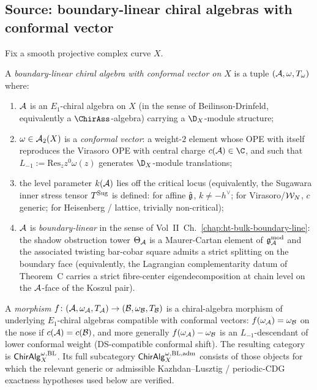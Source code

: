 \subsection{Source: boundary-linear chiral algebras with conformal vector}

Fix a smooth projective complex curve $X$.

\begin{definition}
\label{def:uhf-chiralg-omega-bl}
A \emph{boundary-linear chiral algebra with conformal vector on
$X$} is a tuple $(\mathcal{A}, \omega, T_\omega)$ where:
\begin{enumerate}[label=\textup{(\roman*)}]
\item $\mathcal{A}$ is an $E_1$-chiral algebra on $X$ (in the sense of
 Beilinson-Drinfeld, equivalently a $\ChirAss$-algebra) carrying a
 $\D_X$-module structure;
\item $\omega \in \mathcal{A}_2(X)$ is a \emph{conformal vector}: a
 weight-$2$ element whose OPE with itself reproduces the Virasoro
 OPE with central charge $c(\cA) \in \C$, and such that
 $L_{-1} := \mathrm{Res}_z z^0 \omega(z)$ generates $\D_X$-module
 translations;
\item the level parameter $k(\mathcal{A})$ lies off the critical locus
 (equivalently, the Sugawara inner stress tensor $T^{\mathrm{Sug}}$ is
 defined: for affine $\hat{\mathfrak{g}}$, $k \neq -h^\vee$; for
 Virasoro/$\mathcal{W}_N$, $c$ generic; for Heisenberg / lattice, trivially
 non-critical);
\item $\mathcal{A}$ is \emph{boundary-linear} in the sense of
 Vol~II~Ch.~\ref*{chap:ht-bulk-boundary-line}: the shadow obstruction
 tower $\Theta_{\mathcal{A}}$ is a Maurer-Cartan element of
 $\mathfrak{g}^{\mathrm{mod}}_{\mathcal{A}}$ \textup{and} the associated
 twisting bar-cobar square admits a strict splitting on the
 boundary face (equivalently, the Lagrangian complementarity
 datum of Theorem~C carries a strict fibre-center eigendecomposition
 at chain level on the $\mathcal{A}$-face of the Koszul pair).
\end{enumerate}
A \emph{morphism} $f \colon (\mathcal{A}, \omega_{\mathcal{A}}, T_{\mathcal{A}}) \to
(\mathcal{B}, \omega_{\mathcal{B}}, T_{\mathcal{B}})$ is a chiral-algebra morphism of
underlying $E_1$-chiral algebras compatible with conformal vectors:
$f(\omega_{\mathcal{A}}) = \omega_{\mathcal{B}}$ on the nose if $c(\mathcal{A}) = c(\mathcal{B})$, and
more generally $f(\omega_{\mathcal{A}}) - \omega_{\mathcal{B}}$ is an
$L_{-1}$-descendant of lower conformal weight
(DS-compatible conformal shift). The resulting category is
$\mathsf{ChirAlg}^{\omega,\mathrm{BL}}_X$. Its full subcategory
$\mathsf{ChirAlg}^{\omega,\mathrm{BL,adm}}_X$ consists of those objects for
which the relevant generic or admissible Kazhdan--Lusztig / periodic-CDG
exactness hypotheses used below are verified.
\end{definition}

